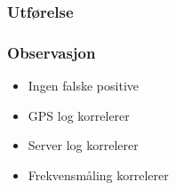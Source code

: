 \documentclass[xcolor=table]{beamer}
\begin{document}
\begin{frame}
\frametitle{Utførelse}
\begin{center}
\end{center}
\end{frame}

\begin{frame}
\frametitle{Observasjon}
      \begin{itemize}
       \setlength\itemsep{2em}
        \item Ingen falske positive
        \item GPS log korrelerer
        \item Server log korrelerer
        \item Frekvensmåling korrelerer
      \end{itemize}
\end{frame}
\end{document}
